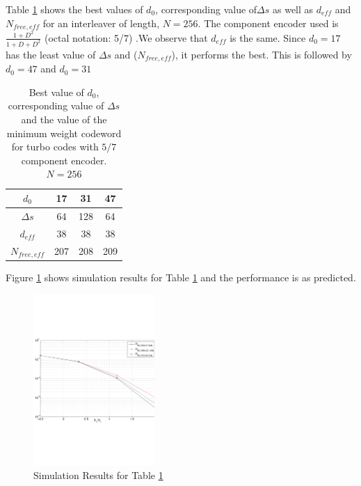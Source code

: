 \documentclass[technicalreport]{ieicej}
\begin{document}
 Table \ref{tab1} shows the best values of $d_0$, corresponding value of$\Delta s$
 as well as  $d_{eff}$ and $N_{free,eff}$
  for an interleaver 
 of length, $N=256$. The component encoder used is $\frac{1 + D^2}{1+D+D^2}$ 
 (octal notation: 5/7) .We observe that $d_{eff}$ is the same. Since $d_0=17$ has the least
 value of $\Delta s$ and ($N_{free,eff}$), it performs the best. This is followed by
 $d_0=47$ and $d_0=31$
 
 \begin{table}[h!]
\centering
\begin{tabular}{||c |c |c |c||} 
 \hline
 $d_0$ & 17 & 31 & 47 \\ [0.5ex] 
 \hline\hline
 $\Delta s$ & 64 & 128 & 64 \\ 
 \hline
  $d_{eff}$ & 38 & 38 & 38 \\ 
  \hline
  $N_{free, eff}$ & 207 & 208 & 209 \\ [1ex] 
 \hline
\end{tabular}
\caption{Best value of $d_0$,  corresponding value of $\Delta s$ 
and the value of the minimum weight codeword for
 turbo codes with $5/7$ component encoder. $N=256$}
\label{tab1}
\end{table}
 Figure \ref{comp1} shows simulation results for Table 
 \ref{tab1} and the performance is as predicted.
\begin{figure}[h!]
\centering
		\includegraphics[height = 6.5cm,trim={0 7.2cm 0 6cm},clip]{myInterleaver_(comparison_256)_5_7_3.pdf}
		\caption{Simulation Results for Table \ref{tab1}}
		\label{comp1}
		\end{figure}
		
\end{document}
